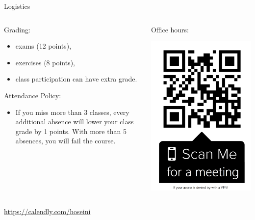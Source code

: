 \documentclass[handout]{beamer}
\begin{document}
\begin{frame}{Logistics}
	\begin{columns}
		\begin{column}{0.7\textwidth}
			Grading: 
			\begin{itemize}
				\item exams (12 points),
				\item exercises (8 points), 
				\item class participation can have extra grade.
			\end{itemize}\medskip
			
			Attendance Policy: 
			\begin{itemize}
				\item If you miss more than 3 classes, every additional absence will lower your class grade by 1 points. With more than 5 absences, you will fail the course.
			\end{itemize}
	\end{column}
	\begin{column}{0.3\textwidth}\begin{center}
			Office hours:
		\end{center}
	\includegraphics[width=\textwidth]{./Figures/qrcode}
	\end{column}
	\end{columns}\begin{flushright}\url{https://calendly.com/hoseini} \end{flushright}
	 




\end{frame}
\end{document}
